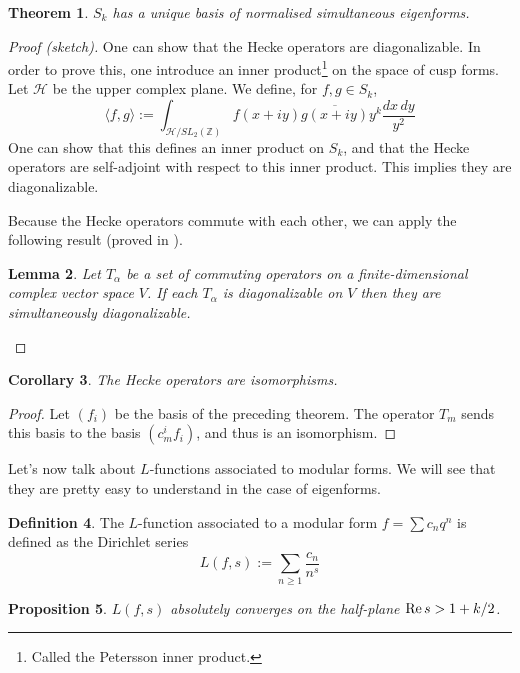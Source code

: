 \documentclass[12pt,a4paper,english]{article}
\theoremstyle{plain}
\newtheorem{thm}{Theorem}[section]
\newtheorem{lem}[thm]{Lemma}
\newtheorem{prop}[thm]{Proposition}
\newtheorem{coro}[thm]{Corollary}
\theoremstyle{definition}
\newtheorem{defi}[thm]{Definition}
\begin{document}
\begin{thm}
$S_k$ has a unique basis of normalised simultaneous eigenforms.
\end{thm}

\begin{proof}[Proof (sketch)]
One can show that the Hecke operators are diagonalizable. In order to prove this, one introduce an inner product\footnote{Called the Petersson inner product.} on the space of cusp forms. Let $\mathcal{H}$ be the upper complex plane. We define, for $f,g\in S_k$,
\begin{equation*}
    \langle f,g\rangle:=\int_{\mathcal{H}/SL_2(\mathbb{Z})}f(x+iy)\overline{g(x+iy)}y^k\frac{dx\,dy}{y^2}
\end{equation*}
One can show that this defines an inner product on $S_k$, and that the  Hecke operators are self-adjoint with respect to this inner product. This implies they are diagonalizable.
\vspace{0.5cm}

Because the Hecke operators commute with each other, we can apply the following result (proved in \cite{konrad}).
\begin{lem}
Let ${T_\alpha}$ be a set of commuting operators on a finite-dimensional
complex vector space $V$. If each $T_\alpha$ is diagonalizable on $V$ then they are simultaneously diagonalizable.
\end{lem}

\end{proof}

\begin{coro}
The Hecke operators are isomorphisms.
\end{coro}
\begin{proof}
Let $(f_i)$ be the basis of the preceding theorem. The operator $T_m$ sends this basis to the basis $(c_m^i f_i)$, and thus is an isomorphism.
\end{proof}

Let's now talk about $L$-functions associated to modular forms. We will see that they are pretty easy to understand in the case of eigenforms.

\begin{defi}
The $L$-function associated to a modular form $f=\sum c_n q^n$ is defined as the Dirichlet series
\begin{equation*}
    L(f,s):=\sum_{n\geqslant 1}\frac{c_n}{n^s}
\end{equation*}
\end{defi}

\begin{prop}
$L(f,s)$ absolutely converges on the half-plane $\text{\normalfont Re}\,s>1+k/2$.
\end{prop}
\end{document}
